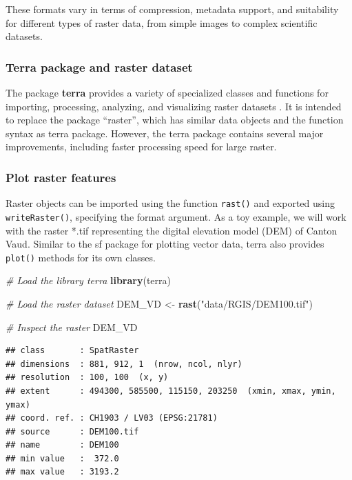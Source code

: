 \documentclass[
]{article}
\newenvironment{Shaded}{\begin{snugshade}}{\end{snugshade}}
\newcommand{\CommentTok}[1]{\textcolor[rgb]{0.56,0.35,0.01}{\textit{#1}}}
\newcommand{\FunctionTok}[1]{\textcolor[rgb]{0.13,0.29,0.53}{\textbf{#1}}}
\newcommand{\NormalTok}[1]{#1}
\newcommand{\OtherTok}[1]{\textcolor[rgb]{0.56,0.35,0.01}{#1}}
\newcommand{\StringTok}[1]{\textcolor[rgb]{0.31,0.60,0.02}{#1}}
\begin{document}
These formats vary in terms of compression, metadata support, and suitability for different types of raster data, from simple images to complex scientific datasets.

\subsubsection{Terra package and raster dataset}\label{terra-package-and-raster-dataset}

The package \textbf{terra} provides a variety of specialized classes and functions for importing, processing, analyzing, and visualizing raster datasets \citep{Hijmans_2024}. It is intended to replace the package ``raster'', which has similar data objects and the function syntax as terra package. However, the terra package contains several major improvements, including faster processing speed for large raster.

\subsubsection{Plot raster features}\label{plot-raster-features}

Raster objects can be imported using the function \texttt{rast()} and exported using \texttt{writeRaster()}, specifying the format argument. As a toy example, we will work with the raster *.tif representing the digital elevation model (DEM) of Canton Vaud. Similar to the sf package for plotting vector data, terra also provides \texttt{plot()} methods for its own classes.

\begin{Shaded}
\begin{Highlighting}[]
\CommentTok{\# Load the library terra }
\FunctionTok{library}\NormalTok{(terra)}

\CommentTok{\# Load the raster dataset}
\NormalTok{DEM\_VD }\OtherTok{\textless{}{-}} \FunctionTok{rast}\NormalTok{(}\StringTok{"data/RGIS/DEM100.tif"}\NormalTok{)}

\CommentTok{\# Inspect the raster}
\NormalTok{DEM\_VD}
\end{Highlighting}
\end{Shaded}

\begin{verbatim}
## class       : SpatRaster 
## dimensions  : 881, 912, 1  (nrow, ncol, nlyr)
## resolution  : 100, 100  (x, y)
## extent      : 494300, 585500, 115150, 203250  (xmin, xmax, ymin, ymax)
## coord. ref. : CH1903 / LV03 (EPSG:21781) 
## source      : DEM100.tif 
## name        : DEM100 
## min value   :  372.0 
## max value   : 3193.2
\end{verbatim}
\end{document}
